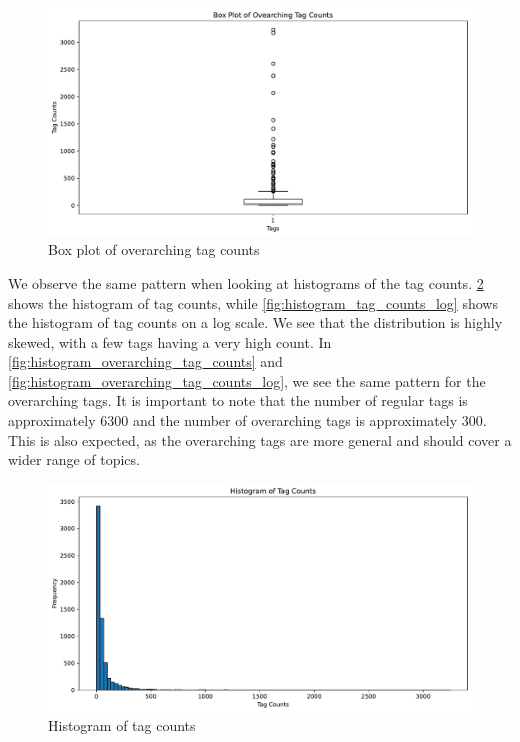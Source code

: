 \begin{figure}[h]
    \centering
    \includegraphics[width=\textwidth]{figures/box_plot_overarching_tag_counts.pdf}
    \caption{Box plot of overarching tag counts}
    \label{fig:box_plot_overarching_tag_counts}
\end{figure}

We observe the same pattern when looking at histograms of the tag counts. \cref{fig:histogram_tag_counts} shows the histogram of tag counts, while \cref{fig:histogram_tag_counts_log} shows the histogram of tag counts on a log scale. We see that the distribution is highly skewed, with a few tags having a very high count. In \cref{fig:histogram_overarching_tag_counts} and \cref{fig:histogram_overarching_tag_counts_log}, we see the same pattern for the overarching tags. It is important to note that the number of regular tags is approximately 6300 and the number of overarching tags is approximately 300. This is also expected, as the overarching tags are more general and should cover a wider range of topics.

\begin{figure}[h]
    \centering
    \includegraphics[width=\textwidth]{figures/histogram_tag_counts.pdf}
    \caption{Histogram of tag counts}
    \label{fig:histogram_tag_counts}
\end{figure}

